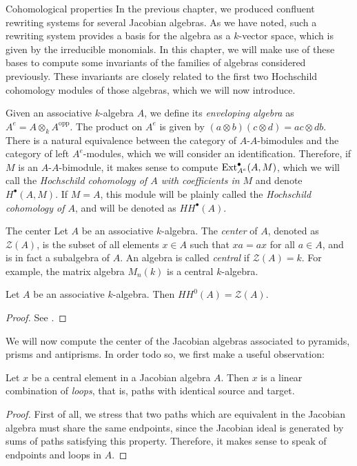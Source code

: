 \begin{chapter}{Cohomological properties}
In the previous chapter, we produced confluent rewriting systems for several Jacobian algebras. As we have noted, such a rewriting system provides a basis for the algebra as a $k$-vector space, which is given by the irreducible monomials. In this chapter, we will make use of these bases to compute some invariants of the families of algebras considered previously. These invariants are closely related to the first two Hochschild cohomology modules of those algebras, which we will now introduce.

Given an associative $k$-algebra $A$, we define its \emph{enveloping algebra} as $A^e=A\otimes_k A^{\mathrm{opp}}$. The product on $A^e$ is given by $(a\otimes b)(c\otimes d)=ac\otimes db$.
There is a natural equivalence between the category of $A$-$A$-bimodules and the category of left $A^e$-modules, which we will consider an identification. Therefore, if $M$ is an $A$-$A$-bimodule, it makes sense to compute $\operatorname{Ext}^\bullet_{A^e}(A,M)$, which we will call the \emph{Hochschild cohomology of $A$ with coefficients in $M$} and denote $H^\bullet(A,M)$.
If $M=A$, this module will be plainly called the \emph{Hochschild cohomology of $A$}, and will be denoted as $HH^\bullet(A)$.

\begin{section}{The center}
Let $A$ be an associative $k$-algebra. The \emph{center} of $A$, denoted as $\mathcal{Z}(A)$, is the subset of all elements $x\in A$ such that $xa=ax$ for all $a\in A$, and is in fact a subalgebra of $A$. An algebra is called \emph{central} if $\mathcal{Z}(A)=k$. For example, the matrix algebra $M_n(k)$ is a central $k$-algebra.

\begin{lemma} Let $A$ be an associative $k$-algebra. Then $HH^0(A) = \mathcal{Z}(A)$.
\end{lemma}
\begin{proof} See \cite{Red01}.
\end{proof}

We will now compute the center of the Jacobian algebras associated to pyramids, prisms and antiprisms. In order todo so, we first make a useful observation:

\begin{obs}\label{central-endpoints} Let $x$ be a central element in a Jacobian algebra $A$. Then $x$ is a linear combination of \emph{loops}, that is, paths with identical source and target.
\end{obs}
\begin{proof} First of all, we stress that two paths which are equivalent in the Jacobian algebra must share the same endpoints, since the Jacobian ideal is generated by sums of paths satisfying this property. Therefore, it makes sense to speak of endpoints and loops in $A$.


\end{proof}
\end{section}
\end{chapter}
